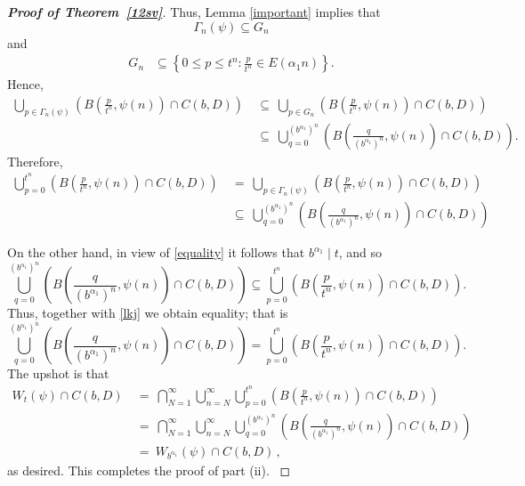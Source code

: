 \documentclass[12pt]{article}
\theoremstyle{definition}
\theoremstyle{remark}
\begin{document}
\begin{proof}[\rm \textbf{Proof of Theorem~\ref{12sv}}]
Thus, Lemma \ref{important} implies that 
$$\Gamma_{n}(\psi)\subseteq G_{n}$$
and 
\begin{equation*}
\begin{aligned}
G_{n}&\subseteq\left\{0\le p\le t^{n}:\frac{p}{t^{n}}\in E(\alpha_{1} n)\right\}. 
\end{aligned}
\end{equation*}
Hence,
\begin{equation*}
\begin{aligned}
 \bigcup_{p\in\Gamma_{n}(\psi)}\left(B\left(\frac{p}{t^{n}},\psi(n)\right)\cap C(b,D)\right)  
&  \ \subseteq \ \bigcup_{p\in G_{n} }\left(B\left(\frac{p}{t^{n}},\psi(n)\right)\cap C(b,D)\right) 
 \\[2ex]
&  \ \subseteq   \ \bigcup_{q=0}^{(b^{\alpha_{1}})^{n}}\left(B\left(\frac{q}{(b^{\alpha_{1}})^{n}},\psi(n)\right)\cap C(b,D)\right).
\end{aligned}
\end{equation*}
Therefore,
\begin{equation}
\begin{aligned}
\bigcup_{p=0}^{t^{n}}\left(B\left(\frac{p}{t^{n}},\psi(n)\right) \cap C(b,D)\right)& \ = \ \bigcup_{p\in\Gamma_{n}(\psi)}\left(B\left(\frac{p}{t^{n}}, \psi(n) \right)\cap C(b,D)\right) \nonumber \\[2ex]
& \ \subseteq \ \bigcup_{q=0}^{(b^{\alpha_{1}})^{n}}\left(B\left(\frac{q}{(b^{\alpha_{1}})^{n}},\psi(n)\right)\cap C(b,D)\right)  \label{lkj}
\end{aligned}
\end{equation}

On the other hand, in view of  \eqref{equality} it follows  that  $b^{\alpha_{1}}\mid t$, and  so
$$\bigcup_{q=0}^{(b^{\alpha_{1}})^{n}}\left(B\left(\frac{q}{(b^{\alpha_{1}})^{n}},\psi(n)\right)\cap C(b,D)\right)\subseteq\bigcup_{p=0}^{t^{n}}\left(B\left(\frac{p}{t^{n}},\psi(n)\right)\cap C(b,D)\right).$$
Thus, together with \eqref{lkj} we obtain equality;  that is  
$$\bigcup_{q=0}^{(b^{\alpha_{1}})^{n}}\left(B\left(\frac{q}{(b^{\alpha_{1}})^{n}},\psi(n)\right)\cap C(b,D)\right) =\bigcup_{p=0}^{t^{n}}\left(B\left(\frac{p}{t^{n}},\psi(n)\right)\cap C(b,D)\right).$$
The upshot is that
\begin{equation*}
\begin{aligned}
W_{t}(\psi)\cap C(b,D)& \ = \ \bigcap_{N=1}^{\infty}\bigcup_{n=N}^{\infty}\bigcup_{p=0}^{t^{n}}\left(B\left(\frac{p}{t^{n}},\psi(n)\right)\cap C(b,D)\right) \\[2ex] &   \ =  \ \bigcap_{N=1}^{\infty}\bigcup_{n=N}^{\infty}\bigcup_{q=0}^{(b^{\alpha_{1}})^{n}}\left(B\left(\frac{q}{(b^{\alpha_{1}})^{n}}, \psi(n)\right)\cap C(b,D)\right) \\[2ex] & \ = \ W_{b^{\alpha_{1}}}(\psi)\cap C(b,D) \, ,
\end{aligned}
\end{equation*}
as desired.  This completes the proof of part (ii). 
\textrm{}
\end{proof}
 
\end{document}
